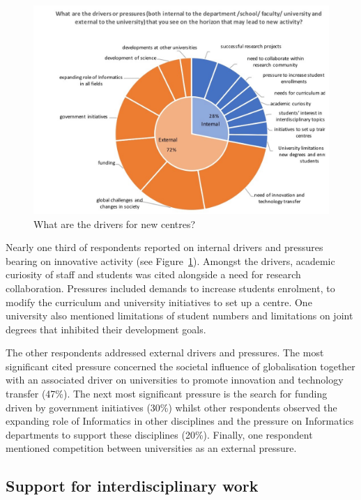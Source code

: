 \begin{figure}[h]
\centering
\includegraphics[width = \linewidth]{charts/5g.jpg}
\caption{What are the drivers for new centres?}
\label{sect5:drivers}
\end{figure}
                                                                                                                    
Nearly one third of respondents reported on internal drivers and pressures bearing on innovative activity (see Figure~\ref{sect5:drivers}). Amongst the drivers, academic curiosity of staff and students was cited alongside a need for research collaboration. Pressures included demands to increase students enrolment, to modify the curriculum and university initiatives to set up a centre. One university also mentioned limitations of student numbers and limitations on joint degrees that inhibited their development goals.

The other respondents addressed external drivers and pressures. The most significant cited pressure concerned the societal influence of globalisation together with an associated driver on universities to promote innovation and  technology transfer (47\%).  The next most significant pressure is the search for funding driven by government initiatives (30\%) whilst other respondents observed the expanding role of Informatics in other disciplines and the pressure on Informatics departments to support these disciplines (20\%). Finally, one respondent mentioned competition between universities as an external pressure.

\subsection{Support for interdisciplinary work}

